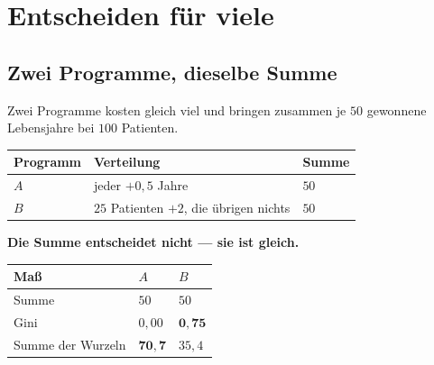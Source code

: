 \chapter{Entscheiden für viele}

\section{Zwei Programme, dieselbe Summe}

\begin{merksatz}
Zwei Programme kosten gleich viel und bringen zusammen je $50$ gewonnene Lebensjahre bei $100$ Patienten.

\begin{center}
{\small
\renewcommand{\arraystretch}{1.5}
\begin{tabular}{@{}P{2.4cm}P{3.0cm}P{2.4cm}@{}}
\toprule
\textbf{Programm} & \textbf{Verteilung} & \textbf{Summe}\\
\midrule
$A$ & jeder $+0{,}5$ Jahre & $50$\\
$B$ & $25$ Patienten $+2$, die übrigen nichts & $50$\\
\bottomrule
\end{tabular}}
\end{center}

\begin{center}
\begin{minipage}{0.9\textwidth}
\textbf{Die Summe entscheidet nicht --- sie ist gleich.}
\end{minipage}
\end{center}

\begin{center}
{\small
\renewcommand{\arraystretch}{1.48}
\begin{tabular}{@{}P{2.6cm}P{2.2cm}P{2.2cm}@{}}
\toprule
\textbf{Maß} & $A$ & $B$\\
\midrule
Summe & $50$ & $50$\\
Gini & $0{,}00$ & $\mathbf{0{,}75}$\\
Summe der Wurzeln & $\mathbf{70{,}7}$ & $35{,}4$\\
\bottomrule
\end{tabular}}
\end{center}

\begin{center}
\begin{minipage}{0.88\textwidth}
\end{minipage}
\end{center}
\end{merksatz}

